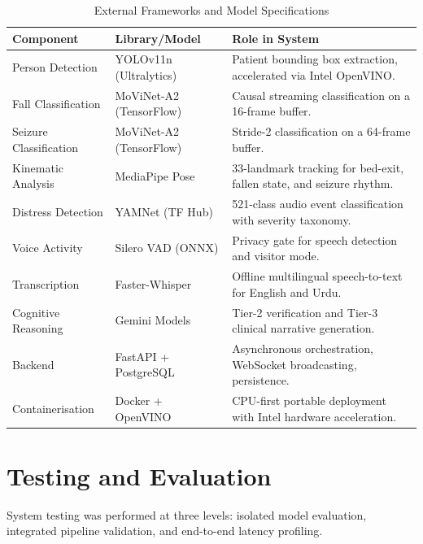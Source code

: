 \begin{table}[H]
    \centering
    \caption{External Frameworks and Model Specifications}
    \label{tab:frameworks}
    \renewcommand{\arraystretch}{1.3}
    \begin{tabular}{|p{3cm}|p{4cm}|p{6cm}|}
    \hline
    \textbf{Component} & \textbf{Library/Model} & \textbf{Role in System} \\ \hline
    Person Detection & YOLOv11n (Ultralytics) & Patient bounding box extraction, accelerated via Intel OpenVINO. \\ \hline
    Fall Classification & MoViNet-A2 (TensorFlow) & Causal streaming classification on a 16-frame buffer. \\ \hline
    Seizure Classification & MoViNet-A2 (TensorFlow) & Stride-2 classification on a 64-frame buffer. \\ \hline
    Kinematic Analysis & MediaPipe Pose & 33-landmark tracking for bed-exit, fallen state, and seizure rhythm. \\ \hline
    Distress Detection & YAMNet (TF Hub) & 521-class audio event classification with severity taxonomy. \\ \hline
    Voice Activity & Silero VAD (ONNX) & Privacy gate for speech detection and visitor mode. \\ \hline
    Transcription & Faster-Whisper & Offline multilingual speech-to-text for English and Urdu. \\ \hline
    Cognitive Reasoning & Gemini Models & Tier-2 verification and Tier-3 clinical narrative generation. \\ \hline
    Backend & FastAPI + PostgreSQL & Asynchronous orchestration, WebSocket broadcasting, persistence. \\ \hline
    Containerisation & Docker + OpenVINO & CPU-first portable deployment with Intel hardware acceleration. \\ \hline
    \end{tabular}
\end{table}

\section{Testing and Evaluation}
\label{sec:testing}

System testing was performed at three levels: isolated model evaluation,
integrated pipeline validation, and end-to-end latency profiling.

